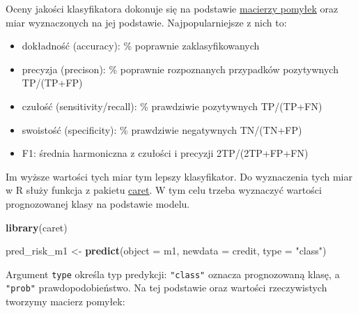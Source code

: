 \documentclass[
]{book}
\newenvironment{Shaded}{\begin{snugshade}}{\end{snugshade}}
\newcommand{\DataTypeTok}[1]{\textcolor[rgb]{0.13,0.29,0.53}{#1}}
\newcommand{\KeywordTok}[1]{\textcolor[rgb]{0.13,0.29,0.53}{\textbf{#1}}}
\newcommand{\NormalTok}[1]{#1}
\newcommand{\OperatorTok}[1]{\textcolor[rgb]{0.81,0.36,0.00}{\textbf{#1}}}
\newcommand{\StringTok}[1]{\textcolor[rgb]{0.31,0.60,0.02}{#1}}
\providecommand{\tightlist}{%
  \setlength{\itemsep}{0pt}\setlength{\parskip}{0pt}}
\begin{document}
Oceny jakości klasyfikatora dokonuje się na podstawie \href{https://pl.wikipedia.org/wiki/Tablica_pomy\%C5\%82ek}{macierzy pomyłek} oraz miar wyznaczonych na jej podstawie. Najpopularniejsze z nich to:

\begin{itemize}
\tightlist
\item
  dokładność (accuracy): \% poprawnie zaklasyfikowanych
\item
  precyzja (precison): \% poprawnie rozpoznanych przypadków pozytywnych TP/(TP+FP)
\item
  czułość (sensitivity/recall): \% prawdziwie pozytywnych TP/(TP+FN)
\item
  swoistość (specificity): \% prawdziwie negatywnych TN/(TN+FP)
\item
  F1: średnia harmoniczna z czułości i precyzji 2TP/(2TP+FP+FN)
\end{itemize}

Im wyższe wartości tych miar tym lepszy klasyfikator. Do wyznaczenia tych miar w R służy funkcja z pakietu \href{https://topepo.github.io/caret/}{caret}. W tym celu trzeba wyznaczyć wartości prognozowanej klasy na podstawie modelu.

\begin{Shaded}
\begin{Highlighting}[]
\KeywordTok{library}\NormalTok{(caret)}

\NormalTok{pred_risk_m1 <-}\StringTok{ }\KeywordTok{predict}\NormalTok{(}\DataTypeTok{object =}\NormalTok{ m1, }\DataTypeTok{newdata =}\NormalTok{ credit, }\DataTypeTok{type =} \StringTok{"class"}\NormalTok{)}
\end{Highlighting}
\end{Shaded}

Argument \texttt{type} określa typ predykcji: \texttt{"class"} oznacza prognozowaną klasę, a \texttt{"prob"} prawdopodobieństwo. Na tej podstawie oraz wartości rzeczywistych tworzymy macierz pomyłek:

\begin{Shaded}
\end{Shaded}
\end{document}
